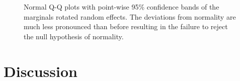 \documentclass[12pt]{article} %
\newcommand{\hh}[1]{{\color{orange} #1}}
\newcommand{\al}[1]{{\color{red} #1}}
\begin{document}
\begin{figure}[htb]
	\centering
	\caption{\label{fig:rotate-radon} Normal Q-Q plots with point-wise 95\% confidence bands of the marginals rotated random effects. The deviations from normality are much less pronounced than before resulting in the failure to reject the null hypothesis of normality.} %
\end{figure}


\section{Discussion}\label{sec:discussion}
\end{document}
